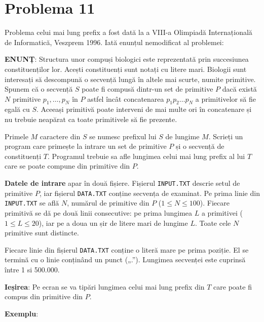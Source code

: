 \section{Problema 11}

Problema celui mai lung prefix a fost dată la a VIII-a Olimpiadă
Internațională de Informatică, Veszprem 1996. Iată enunțul nemodificat al
problemei:

{\bf ENUNȚ}: Structura unor compuși biologici este reprezentată prin
succesiunea con\-sti\-tu\-en\-ți\-lor lor. Acești constituenți sunt notați cu
litere mari. Biologii sunt interesați să descompună o secvență lungă în altele
mai scurte, numite primitive. Spunem că o secvență $S$ poate fi compusă
dintr-un set de primitive $P$ dacă există $N$ primitive $p_1, \dots, p_N$ în
$P$ astfel încât concatenarea $p_1 p_2 \dots p_N$ a primitivelor să fie egală
cu $S$. Aceeași primitivă poate interveni de mai multe ori în concatenare și
nu trebuie neapărat ca toate primitivele să fie prezente.

Primele $M$ caractere din $S$ se numesc prefixul lui $S$ de lungime
$M$. Scrieți un program care primește la intrare un set de primitive $P$ și o
secvență de constituenți $T$. Programul trebuie sa afle lungimea celui mai
lung prefix al lui $T$ care se poate compune din primitive din $P$.

{\bf Datele de intrare} apar în două fișiere. Fișierul {\tt INPUT.TXT} descrie
setul de primitive $P$, iar fișierul {\tt DATA.TXT} conține secvența de
examinat. Pe prima linie din {\tt INPUT.TXT} se află $N$, numărul de primitive
din $P$ ($1 \leq N \leq 100$). Fiecare primitivă se dă pe două linii
consecutive: pe prima lungimea $L$ a primitivei ($1 \leq L \leq 20$), iar pe a
doua un șir de litere mari de lungime $L$. Toate cele $N$ primitive sunt
distincte.

Fiecare linie din fișierul {\tt DATA.TXT} conține o literă mare pe prima
poziție. El se termină cu o linie conținând un punct („.”). Lungimea secvenței
este cuprinsă între 1 si 500.000.

{\bf Ieșirea}: Pe ecran se va tipări lungimea celui mai lung prefix din $T$
care poate fi compus din primitive din $P$.

{\bf Exemplu}:

